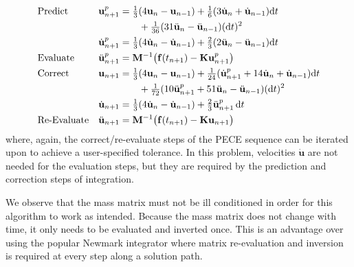 \begin{subequations}
    \notag
    \begin{align}
    \mbox{} & \text{Predict} &
    \mathbf{u}_{n+1}^p & = \tfrac{1}{3} (
    4 \mathbf{u}_n - \mathbf{u}_{n-1} ) + 
    \tfrac{1}{6} ( 3 \dot{\mathbf{u}}_n + 
    \dot{\mathbf{u}}_{n-1} ) \mathrm{d}t \\ & & & \qquad + 
    \tfrac{1}{36} ( 31 \ddot{\mathbf{u}}_n - 
    \ddot{\mathbf{u}}_{n-1} ) ( \mathrm{d}t )^2 \\
    \mbox{} & &
    \dot{\mathbf{u}}_{n+1}^p & = \tfrac{1}{3} 
    ( 4 \dot{\mathbf{u}}_n - \dot{\mathbf{u}}_{n-1} ) + 
    \tfrac{2}{3} ( 2 \ddot{\mathbf{u}}_n - \ddot{\mathbf{u}}_{n-1} ) \mathrm{d}t \\
    \mbox{} & \text{Evaluate} &
    \ddot{\mathbf{u}}^p_{n+1} & = \mathbf{M}^{-1} \bigl( \mathbf{f}(t_{n+1} ) - 
    \mathbf{K} \mathbf{u}_{n+1}^p \bigr) \\
    \mbox{} & \text{Correct} & 
    \mathbf{u}_{n+1} & = \tfrac{1}{3} (
    4  \mathbf{u}_n - \mathbf{u}_{n-1} ) +
    \tfrac{1}{24} ( \dot{\mathbf{u}}^p_{n+1} +
    14 \dot{\mathbf{u}}_n + \dot{\mathbf{u}}_{n-1} ) \mathrm{d}t  \\
    \mbox{} & & & \qquad +
    \tfrac{1}{72} ( 10 \ddot{\mathbf{u}}^p_{n+1} + 
    51 \ddot{\mathbf{u}}_n - \ddot{\mathbf{u}}_{n-1} ) ( \mathrm{d}t )^2 \\ 
    \mbox{} & &
    \dot{\mathbf{u}}_{n+1} & = \tfrac{1}{3} 
    ( 4 \dot{\mathbf{u}}_n - \dot{\mathbf{u}}_{n-1} ) + 
    \tfrac{2}{3} \ddot{\mathbf{u}}^p_{n+1} \, \mathrm{d}t \\
    \mbox{} & \text{Re-Evaluate} & 
    \ddot{\mathbf{u}}_{n+1} & = \mathbf{M}^{-1} \bigl( \mathbf{f}(t_{n+1} ) - 
    \mathbf{K} \mathbf{u}_{n+1} \bigr) 
    \end{align}
\end{subequations}
where, again, the correct\slash re-evaluate steps of the PECE sequence can be iterated upon to achieve a user-specified tolerance.  In this problem, velocities $\dot{\mathbf{u}}$ are not needed for the evaluation steps, but they are required by the prediction and correction steps of integration.

We observe that the mass matrix must not be ill conditioned in order for this algorithm to work as intended.  Because the mass matrix does not change with time, it only needs to be evaluated and inverted once.  This is an advantage over using the popular Newmark \cite{Newmark59} integrator where matrix re-evaluation and inversion is required at every step along a solution path.

